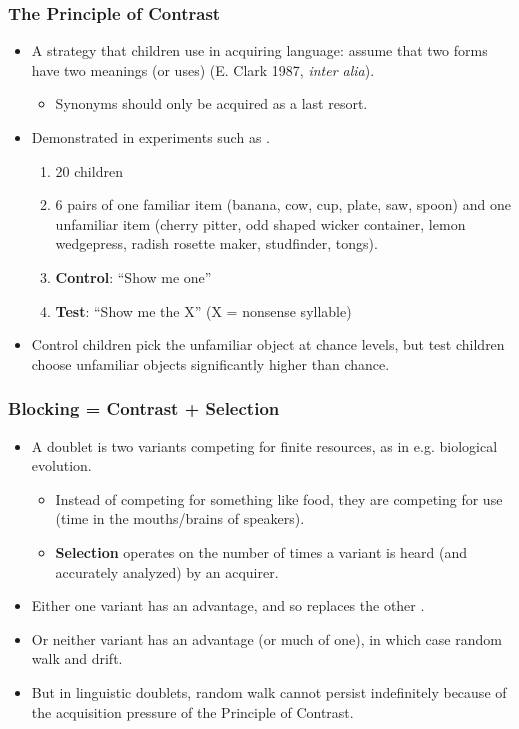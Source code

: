 \documentclass[hyperref={pdfpagelabels=false}]{beamer}
\begin{document}
\begin{frame}
\frametitle{The Principle of Contrast}
\begin{itemize}
	\item A strategy that children use in acquiring language: assume that two forms have two meanings (or uses) (E. Clark 1987, \textsl{inter alia}).
		\begin{itemize} \item Synonyms should only be acquired as a last resort.\end{itemize}
	\item Demonstrated in experiments such as \citet{markmanwachtel1988}.
		\begin{enumerate}
			\item 20 children
			\item 6 pairs of one familiar item (banana, cow, cup, plate, saw, spoon) and one unfamiliar item (cherry pitter, odd shaped wicker container, lemon wedgepress, radish rosette maker, studfinder, tongs).
			\item \textbf{Control}: ``Show me one''
			\item \textbf{Test}: ``Show me the X'' (X = nonsense syllable)
		\end{enumerate}
	\item Control children pick the unfamiliar object at chance levels, but test children choose unfamiliar objects significantly higher than chance.
\end{itemize}
\end{frame}


\begin{frame}
\frametitle{Blocking = Contrast + Selection}
\begin{itemize}
	\item A doublet is two variants competing for finite resources, as in e.g. biological evolution.
		\begin{itemize} 
			\item Instead of competing for something like food, they are competing for use (time in the mouths/brains of speakers). 
			\item \textbf{Selection} operates on the number of times a variant is heard (and accurately analyzed) by an acquirer.
			\end{itemize}
	\item Either one variant has an advantage, and so replaces the other \citep[following a logistic function;][]{nowak2006}.
	\item Or neither variant has an advantage (or much of one), in which case random walk and drift.
	\item But in linguistic doublets, random walk cannot persist indefinitely because of the acquisition pressure of the Principle of Contrast.
\end{itemize}
\end{frame}
\end{document}
